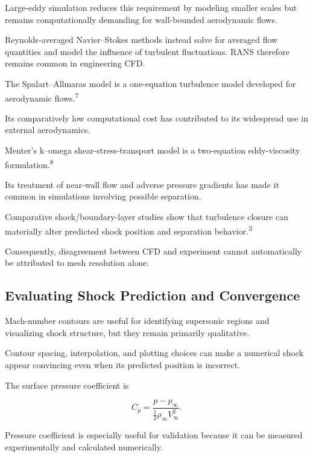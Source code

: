 \documentclass[10pt]{article}
\newcommand{\supercite}[1]{\textsuperscript{#1}}
\begin{document}
Large-eddy simulation reduces this requirement by modeling smaller
scales but remains computationally demanding for wall-bounded
aerodynamic flows.

Reynolds-averaged Navier--Stokes methods instead solve for averaged flow
quantities and model the influence of turbulent fluctuations. RANS
therefore remains common in engineering CFD.

The Spalart--Allmaras model is a one-equation turbulence model developed
for aerodynamic flows.\supercite{7}

Its comparatively low computational cost has contributed to its
widespread use in external aerodynamics.

Menter's k--omega shear-stress-transport model is a two-equation
eddy-viscosity formulation.\supercite{8}

Its treatment of near-wall flow and adverse pressure gradients has made
it common in simulations involving possible separation.

Comparative shock/boundary-layer studies show that turbulence closure
can materially alter predicted shock position and separation
behavior.\supercite{3}

Consequently, disagreement between CFD and experiment cannot
automatically be attributed to mesh resolution alone.


\subsection{Evaluating Shock Prediction and Convergence}

Mach-number contours are useful for identifying supersonic regions and
visualizing shock structure, but they remain primarily qualitative.

Contour spacing, interpolation, and plotting choices can make a
numerical shock appear convincing even when its predicted position is
incorrect.

The surface pressure coefficient is

\begin{equation}
C_p =
\frac{p-p_{\infty}}
{\frac{1}{2}\rho_{\infty}V_{\infty}^{2}}.
\end{equation}

Pressure coefficient is especially useful for validation because it can
be measured experimentally and calculated numerically.
\end{document}

